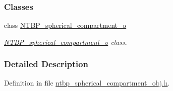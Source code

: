 \subsubsection*{Classes}
\begin{DoxyCompactItemize}
\item 
class \hyperlink{class_n_t_b_p__spherical__compartment__o}{NTBP\_\-spherical\_\-compartment\_\-o}
\begin{DoxyCompactList}\small\item\em \hyperlink{class_n_t_b_p__spherical__compartment__o}{NTBP\_\-spherical\_\-compartment\_\-o} class. \item\end{DoxyCompactList}\end{DoxyCompactItemize}


\subsubsection{Detailed Description}


Definition in file \hyperlink{ntbp__spherical__compartment__obj_8h_source}{ntbp\_\-spherical\_\-compartment\_\-obj.h}.

